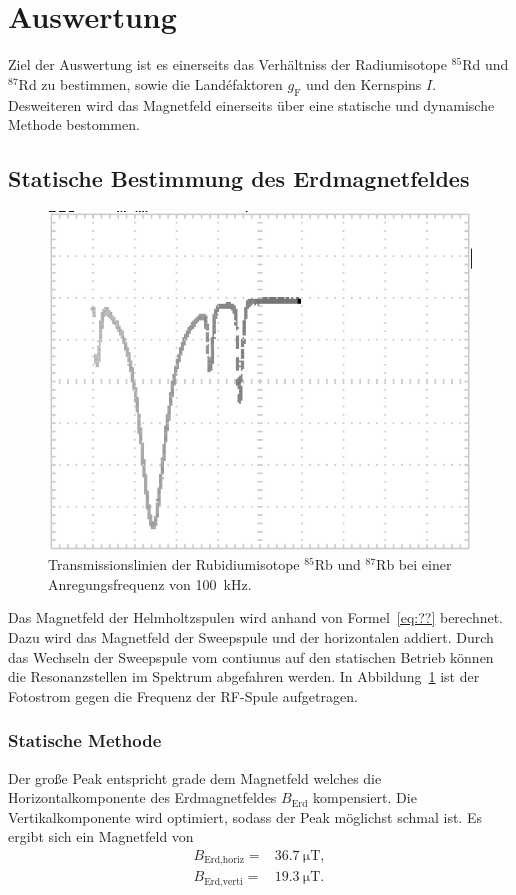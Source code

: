 \section{Auswertung}%
\label{sec:auswertung}

Ziel der Auswertung ist es einerseits das Verhältniss der Radiumisotope
$^{85}$Rd und $^{87}$Rd zu bestimmen, sowie die Land\'efaktoren $g_\text{F}$ und
den Kernspins $I$.
Desweiteren wird das Magnetfeld einerseits über eine statische und dynamische
Methode bestommen.
\subsection{Statische Bestimmung des Erdmagnetfeldes}%
\label{sub:statische_bestimmung_des_erdmagnetfeldes}
\begin{figure}
	\centering
	\includegraphics[width=\linewidth]{picture/Transmission_Spek_cut.JPG}
	\caption{Transmissionslinien der Rubidiumisotope $^{85}$Rb und $^{87}$Rb bei
	einer Anregungsfrequenz von \SI{100}{\kilo\hertz}.}
	\label{fig:transmission}
\end{figure}
Das Magnetfeld der Helmholtzspulen wird anhand von Formel~\ref{eq:??} 
berechnet. 
Dazu wird das Magnetfeld der Sweepspule und der horizontalen addiert. 
Durch das Wechseln der Sweepspule vom contiunus auf den statischen Betrieb
können die Resonanzstellen im Spektrum abgefahren werden.
In Abbildung~\ref{fig:transmission} ist der Fotostrom gegen die Frequenz der
RF-Spule aufgetragen. 

\subsubsection{Statische Methode}%
\label{ssub:subsubsection_name}
Der große Peak entspricht grade dem Magnetfeld welches die Horizontalkomponente
des Erdmagnetfeldes $B_\text{Erd}$ kompensiert.
Die Vertikalkomponente wird optimiert, sodass der Peak möglichst schmal ist. 
Es ergibt sich ein Magnetfeld von 
\begin{eqnarray}
	B_\text{Erd,horiz} =& \SI{36.7}{\micro\tesla}, \\
	B_\text{Erd,verti} =& \SI{19.3}{\micro\tesla}. 
\end{eqnarray}

